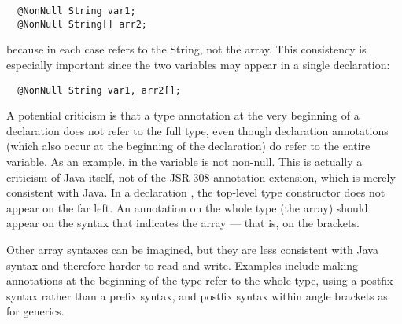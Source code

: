 \documentclass[10pt]{article}
\begin{document}
\begin{Verbatim}
  @NonNull String var1;
  @NonNull String[] arr2;
\end{Verbatim}

\noindent
because in each case  refers to the String, not the array.
This consistency is especially important since the two variables may appear in a single
declaration:

\begin{Verbatim}
  @NonNull String var1, arr2[];
\end{Verbatim}

% 




A potential criticism is that a type annotation at the very beginning of a
declaration does not refer to the full type, even though declaration
annotations (which also occur at the beginning of
the declaration) do refer to the entire variable.  As an example, in
 the variable  is not non-null.
This is actually a criticism of Java itself, not of the JSR 308
annotation extension, which is merely consistent with Java.  In a
declaration , the top-level type constructor does not
appear on the far left.  An annotation on the whole type (the array) should
appear on the syntax that indicates the array --- that is, on the brackets.


Other array syntaxes can be imagined, but they are less consistent with
Java syntax and therefore harder to read and write.
Examples include
making annotations at the beginning of the type refer to the whole type,
using a postfix syntax rather than a prefix syntax, and postfix syntax
within angle brackets as for generics.
\end{document}
